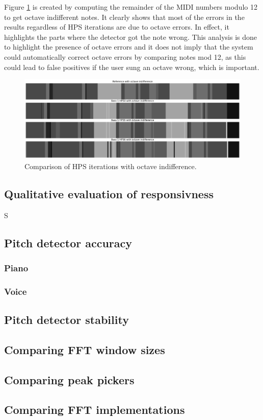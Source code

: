 Figure \ref{fig:hpsOctaveErrors} is created by computing the remainder of the MIDI numbers modulo 12 to get octave indifferent notes. It clearly shows that most of the errors in the results regardless of HPS iterations are due to octave errors. In effect, it highlights the parts where the detector got the note wrong. This analysis is done to highlight the presence of octave errors and it does not imply that the system could automatically correct octave errors by comparing notes mod 12, as this could lead to false positives if the user sung an octave wrong, which is important.

\begin{figure}[ht]
    \centering
    \includegraphics[width=\textwidth]{./images/hpsOctaveErrors.png}
    \caption{Comparison of HPS iterations with octave indifference. \label{fig:hpsOctaveErrors}}
\end{figure}


\subsection{Qualitative evaluation of responsivness}S
\subsection{Pitch detector accuracy}





\subsubsection{Piano}
\subsubsection{Voice}
\subsection{Pitch detector stability}
\subsection{Comparing FFT window sizes}
\subsection{Comparing peak pickers}
\subsection{Comparing FFT implementations}